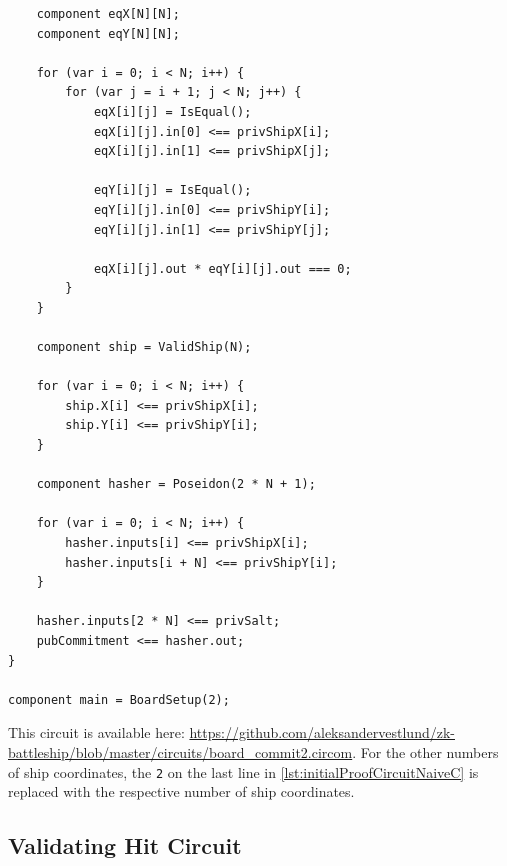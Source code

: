\begin{listing}[H]
    \ContinuedFloat
    \begin{verbatim}
    component eqX[N][N];
    component eqY[N][N];

    for (var i = 0; i < N; i++) {
        for (var j = i + 1; j < N; j++) {
            eqX[i][j] = IsEqual();
            eqX[i][j].in[0] <== privShipX[i];
            eqX[i][j].in[1] <== privShipX[j];

            eqY[i][j] = IsEqual();
            eqY[i][j].in[0] <== privShipY[i];
            eqY[i][j].in[1] <== privShipY[j];

            eqX[i][j].out * eqY[i][j].out === 0;
        }
    }

    component ship = ValidShip(N);

    for (var i = 0; i < N; i++) {
        ship.X[i] <== privShipX[i];
        ship.Y[i] <== privShipY[i];
    }

    component hasher = Poseidon(2 * N + 1);
    
    for (var i = 0; i < N; i++) {
        hasher.inputs[i] <== privShipX[i];
        hasher.inputs[i + N] <== privShipY[i];
    }

    hasher.inputs[2 * N] <== privSalt;
    pubCommitment <== hasher.out;
}

component main = BoardSetup(2);
    \end{verbatim}
    \caption{Na{\"\i}ve commitment for two coordinates (continued).}
    \label{lst:initialProofCircuitNaiveC}
\end{listing}

This circuit is available here: \url{https://github.com/aleksandervestlund/zk-battleship/blob/master/circuits/board_commit2.circom}. For the other numbers of ship coordinates, the \texttt{2} on the last line in \cref{lst:initialProofCircuitNaiveC} is replaced with the respective number of ship coordinates.

\subsection{Validating Hit Circuit}


